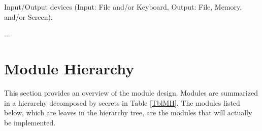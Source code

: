 \documentclass[12pt, titlepage]{article}
\newcounter{ucnum}
\newcommand{\uctheucnum}{UC\theucnum}
\begin{document}
\begin{description}
\item[ \uctheucnum \label{ucIO}:] Input/Output devices
  (Input: File and/or Keyboard, Output: File, Memory, and/or Screen).
\item ...
\end{description}

\section{Module Hierarchy} \label{SecMH}

This section provides an overview of the module design. Modules are summarized
in a hierarchy decomposed by secrets in Table \ref{TblMH}. The modules listed
below, which are leaves in the hierarchy tree, are the modules that will
actually be implemented.
\end{document}
